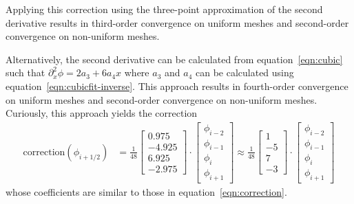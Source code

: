 \documentclass{article}
\begin{document}
Applying this correction using the three-point approximation of the second derivative results in third-order convergence on uniform meshes and second-order convergence on non-uniform meshes.

Alternatively, the second derivative can be calculated from equation~\eqref{eqn:cubic} such that $\partial_x^2 \phi = 2a_3 + 6a_4x$ where $a_3$ and $a_4$ can be calculated using equation~\eqref{eqn:cubicfit-inverse}.  This approach results in fourth-order convergence on uniform meshes and second-order convergence on non-uniform meshes.  Curiously, this approach yields the correction
\begin{align}
	\mathrm{correction}(\phi_{i+1/2})
	&=
	\frac{1}{48}
	\begin{bmatrix}
		0.975 \\ -4.925 \\ 6.925 \\ -2.975
	\end{bmatrix}
	\cdot
	\begin{bmatrix}
		\phi_{i-2} \\
		\phi_{i-1} \\
		\phi_i \\
		\phi_{i+1}
	\end{bmatrix} 
	\approx
	\frac{1}{48}
	\begin{bmatrix}
		1 \\ -5 \\ 7 \\ -3
	\end{bmatrix}
	\cdot
	\begin{bmatrix}
		\phi_{i-2} \\
		\phi_{i-1} \\
		\phi_i \\
		\phi_{i+1}
	\end{bmatrix}
\end{align}
whose coefficients are similar to those in equation~\ref{eqn:correction}.




\end{document}
